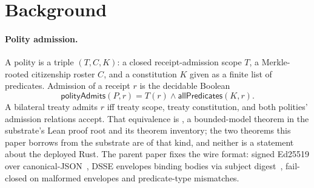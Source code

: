 \section{Background}
\label{sec:background}

\paragraph{Polity admission.}
A polity is a triple $(T, C, K)$: a closed receipt-admission scope $T$, a Merkle-rooted citizenship roster $C$, and a constitution $K$ given as a finite list of predicates. Admission of a receipt $r$ is the decidable Boolean
\[
  \mathsf{polityAdmits}(P, r) = T(r) \wedge \mathsf{allPredicates}(K, r).
\]
A bilateral treaty admits $r$ iff treaty scope, treaty constitution, and both polities' admission relations accept. That equivalence is , a bounded-model theorem in the substrate's Lean proof root and its theorem inventory; the two theorems this paper borrows from the substrate are of that kind, and neither is a statement about the deployed Rust. The parent paper fixes the wire format: signed Ed25519 over canonical-JSON~\cite{rfc8785}, DSSE envelopes binding bodies via subject digest~\cite{dsse}, fail-closed on malformed envelopes and predicate-type mismatches.

